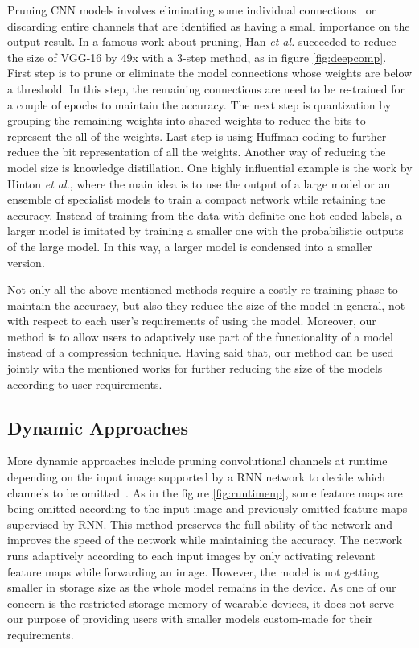 Pruning CNN models involves eliminating some individual connections~\cite{molchanov2016pruning} \cite{Yu_2018_CVPR}\cite{Wang2018StructuredPP} or discarding entire channels \cite{He_2017_ICCV}\cite{li2016pruning} that are identified as having a small importance on the output result.
In a famous work about pruning\cite{han2015deep}, Han \emph{et al.} succeeded to reduce the size of VGG-16 by 49x with a 3-step method, as in figure \ref{fig:deepcomp}. 
First step is to prune or eliminate the model connections whose weights are below a threshold. 
In this step, the remaining connections are need to be re-trained for a couple of epochs to maintain the accuracy.
The next step is quantization by grouping the remaining weights into shared weights to reduce the bits to represent the all of the weights.
Last step is using Huffman coding to further reduce the bit representation of all the weights. 
Another way of reducing the model size is knowledge distillation. 
One highly influential example is the work by Hinton \emph{et al.}, where the main idea is to use the output of a large model or an ensemble of specialist models to train a compact network while retaining the accuracy.
Instead of training from the data with definite one-hot coded labels, a larger model is imitated by training a smaller one with the probabilistic outputs of the large model.
In this way, a larger model is condensed into a smaller version.

Not only all the above-mentioned methods require a costly re-training phase to maintain the accuracy,
but also they reduce the size of the model in general, not with respect to each user's requirements of using the model. 
Moreover, our method is to allow users to adaptively use part of the functionality of a model instead of a compression technique.
Having said that, our method can be used jointly with the mentioned works for further reducing the size of the models according to user requirements.

\subsection{Dynamic Approaches}

More dynamic approaches include pruning convolutional channels at runtime depending on the input image supported by a RNN network to decide which channels to be omitted~\cite{Lin2017RuntimeNP}. 
As in the figure \ref{fig:runtimenp}, some feature maps are being omitted according to the input image and previously omitted feature maps supervised by RNN.
This method preserves the full ability of the network and improves the speed of the network while maintaining the accuracy. 
The network runs adaptively according to each input images by only activating relevant feature maps while forwarding an image.
However, the model is not getting smaller in storage size as the whole model remains in the device. 
As one of our concern is the restricted storage memory of wearable devices, it does not serve our purpose of providing users with smaller models custom-made for their requirements. 

